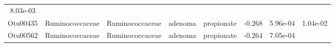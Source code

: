 \documentclass[11pt,]{article}
\begin{document}
\begin{longtable}[]{@{}cccccccc@{}}
\begin{minipage}[t]{0.08\columnwidth}
8.03e-03\strut
\end{minipage}\tabularnewline
\begin{minipage}[t]{0.08\columnwidth}\centering\strut
Otu00435\strut
\end{minipage} & \begin{minipage}[t]{0.15\columnwidth}\centering\strut
Ruminococcaceae\strut
\end{minipage} & \begin{minipage}[t]{0.15\columnwidth}\centering\strut
Ruminococcaceae\strut
\end{minipage} & \begin{minipage}[t]{0.08\columnwidth}\centering\strut
adenoma\strut
\end{minipage} & \begin{minipage}[t]{0.09\columnwidth}\centering\strut
propionate\strut
\end{minipage} & \begin{minipage}[t]{0.07\columnwidth}\centering\strut
-0.268\strut
\end{minipage} & \begin{minipage}[t]{0.08\columnwidth}\centering\strut
5.96e-04\strut
\end{minipage} & \begin{minipage}[t]{0.08\columnwidth}\centering\strut
1.04e-02\strut
\end{minipage}\tabularnewline
\begin{minipage}[t]{0.08\columnwidth}\centering\strut
Otu00562\strut
\end{minipage} & \begin{minipage}[t]{0.15\columnwidth}\centering\strut
Ruminococcaceae\strut
\end{minipage} & \begin{minipage}[t]{0.15\columnwidth}\centering\strut
Ruminococcaceae\strut
\end{minipage} & \begin{minipage}[t]{0.08\columnwidth}\centering\strut
adenoma\strut
\end{minipage} & \begin{minipage}[t]{0.09\columnwidth}\centering\strut
propionate\strut
\end{minipage} & \begin{minipage}[t]{0.07\columnwidth}\centering\strut
-0.264\strut
\end{minipage} & \begin{minipage}[t]{0.08\columnwidth}\centering\strut
7.05e-04\strut
\end{minipage} & \begin{minipage}[t]{0.08\columnwidth}\centering\strut

\end{minipage}
\end{longtable}
\end{document}
